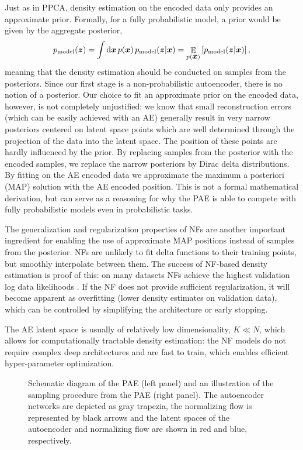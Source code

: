 \documentclass[10pt]{article} \usepackage[accepted]{tmlr}
\DeclareMathOperator{\EE}{\mathbb{E}}
\def\bi#1{\hbox{\boldmath{$#1$}}}
\begin{document}
Just as in PPCA, density estimation on the encoded data only provides an approximate prior.
Formally, for a fully probabilistic model, a prior would be given by the aggregate posterior,
\begin{equation}
\label{prior1}
p_{\mathrm{model}}(\bi{z}) = \int \mathrm{d}\bi{x}\, p(\bi{x})\, p_{\mathrm{model}}(\bi{z}|\bi{x}) =  \EE_{p(\bi{x})}\left[ p_{\mathrm{model}}(\bi{z}|\bi{x})\right],
\end{equation}
meaning that the density estimation should be conducted on samples from the posteriors.
Since our first stage is a non-probabilistic autoencoder, there is no notion of a posterior. Our choice to fit an approximate prior on the encoded data, however, is not completely unjustified: we know that small reconstruction errors (which can be easily achieved with an AE) generally result in very narrow posteriors centered on latent space points which are well determined through the projection of the data into the latent space. The position of these points are hardly influenced by the prior. 
By replacing samples from the posterior with the encoded samples, we replace the narrow posteriors by Dirac delta distributions. By fitting on the AE encoded data we approximate the maximum a posteriori (MAP) solution with the AE encoded position. This is not a formal mathematical derivation, but can serve as a reasoning for why the PAE is able to compete with fully probabilistic models even in probabilistic tasks.

The generalization and regularization properties of NFs are another important ingredient for enabling the use of approximate MAP positions instead of samples from the posterior. NFs are unlikely to fit delta functions to their training points, but smoothly interpolate between them. The success of NF-based density estimation is proof of this: on many datasets NFs achieve the highest validation log data likelihoods \citep{durkan2019neural}. If the NF does not provide sufficient regularization, it will become apparent as overfitting (lower density estimates on validation data), which can be controlled by simplifying the architecture or early stopping. 

The AE latent space is usually of relatively low dimensionality, $K{\ll}N$, which allows for computationally tractable density estimation: the NF models do not require complex deep architectures and are fast to train, which enables efficient hyper-parameter optimization.

\begin{figure}
\caption{\label{fig:illu} Schematic diagram of the PAE (left panel) and an illustration of the sampling procedure from the PAE (right panel). The autoencoder networks are depicted as gray trapezia, the normalizing flow is represented by black arrows and the latent spaces of the autoencoder and normalizing flow are shown in red and blue, respectively.}
\end{figure}
\end{document}
